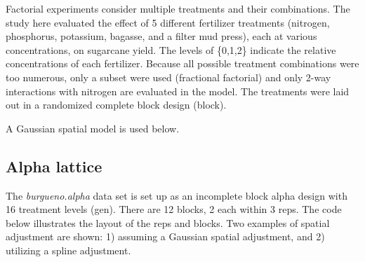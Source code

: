 \documentclass[
]{book}
\newenvironment{Shaded}{\begin{snugshade}}{\end{snugshade}}
\newcommand{\NormalTok}[1]{#1}
\begin{document}
Factorial experiments consider multiple treatments and their combinations. The study here evaluated the effect of 5 different fertilizer treatments (nitrogen, phosphorus, potassium, bagasse, and a filter mud press), each at various concentrations, on sugarcane yield. The levels of \{0,1,2\} indicate the relative concentrations of each fertilizer. Because all possible treatment combinations were too numerous, only a subset were used (fractional factorial) and only 2-way interactions with nitrogen are evaluated in the model. The treatments were laid out in a randomized complete block design (block).

A Gaussian spatial model is used below.

\begin{Shaded}
\end{Shaded}

\hypertarget{alpha-lattice-1}{%
\subsection{Alpha lattice}\label{alpha-lattice-1}}

The \emph{burgueno.alpha} data set is set up as an incomplete block alpha design with 16 treatment levels (gen). There are 12 blocks, 2 each within 3 reps. The code below illustrates the layout of the reps and blocks. Two examples of spatial adjustment are shown: 1) assuming a Gaussian spatial adjustment, and 2) utilizing a spline adjustment.
\end{document}
